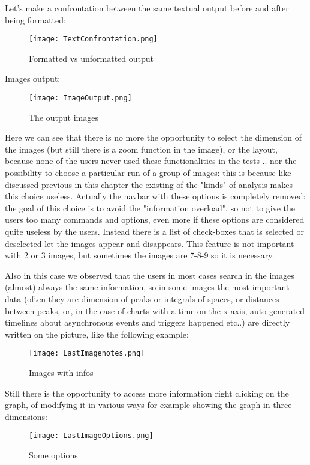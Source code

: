 Let's make a confrontation between the same textual output before and after being formatted:

\begin{figure}[H]
\centering
\texttt{[image: TextConfrontation.png]} 
\caption{Formatted vs unformatted output}
\end{figure}  


Images output:

\begin{figure}[H]
\centering
\texttt{[image: ImageOutput.png]} 
\caption{The output images}
\end{figure}  

Here we can see that there is no more the opportunity to select the dimension of the images (but still there is a zoom function in the image), or the layout, because none of the users never used these functionalities in the tests .. nor the possibility to choose a particular run of a group of images: this is because like discussed previous in this chapter the existing of the "kinds" of analysis makes this choice useless. Actually the navbar with these options is completely removed: the goal of this choice is to avoid the "information overload", so not to give the users too many commands and options, even more if these options are considered quite useless by the users.
Instead there is a list of check-boxes that is selected or deselected let the images appear and disappears. This feature is not important with 2 or 3 images, but sometimes the images are 7-8-9 so it is necessary.

Also in this case we observed that the users in most cases search in the images (almost) always the same information, so in some images the most important data (often they are dimension of peaks or integrals of spaces, or distances between peaks, or, in the case of charts with a time on the x-axis, auto-generated timelines about asynchronous events and triggers happened etc..) are directly written on the picture, like the following example:

\begin{figure}[H]
\centering
\texttt{[image: LastImagenotes.png]} 
\caption{Images with infos}
\end{figure}   

Still there is the opportunity to access more information right clicking on the graph, of modifying it in various ways for example showing the graph in three dimensions: 

\begin{figure}[H]
\centering
\texttt{[image: LastImageOptions.png]} 
\caption{Some options}
\end{figure}  

